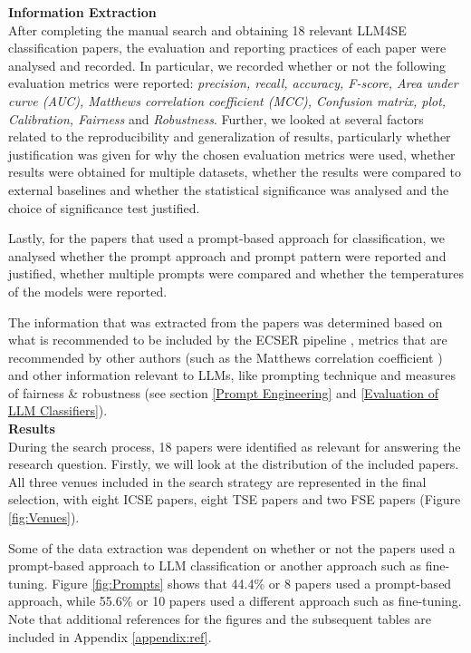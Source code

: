 \documentclass[a4paper]{article}
\begin{document}
\textbf{Information Extraction}\\
After completing the manual search and obtaining 18 relevant LLM4SE classification papers, the evaluation and reporting practices of each paper were analysed and recorded. In particular, we recorded whether or not the following evaluation metrics were reported: \textit{precision, recall, accuracy, F-score, Area under curve (AUC), Matthews correlation coefficient (MCC), Confusion matrix, plot, Calibration, Fairness} and \textit{Robustness}.
Further, we looked at several factors related to the reproducibility and generalization of results, particularly whether justification was given for why the chosen evaluation metrics were used, whether results were obtained for multiple datasets, whether the results were compared to external baselines and whether the statistical significance was analysed and the choice of significance test justified. 

Lastly, for the papers that used a prompt-based approach for classification, we analysed whether the prompt approach and prompt pattern were reported and justified, whether multiple prompts were compared and whether the temperatures of the models were reported.

The information that was extracted from the papers was determined based on what is recommended to be included by the ECSER pipeline \cite{Dellanna2022}, metrics that are recommended by other authors (such as the Matthews correlation coefficient \cite{Chicco2020,Foody2023,Yao2020}) and other information relevant to LLMs, like prompting technique and measures of fairness \& robustness (see section \ref{Prompt Engineering} and \ref{Evaluation of LLM Classifiers}). \\

\textbf{Results}\\
During the search process, 18 papers were identified as relevant for answering the research question. Firstly, we will look at the distribution of the included papers. All three venues included in the search strategy are represented in the final selection, with eight ICSE papers, eight TSE papers and two FSE papers (Figure \ref{fig:Venues}). 
	
Some of the data extraction was dependent on whether or not the papers used a prompt-based approach to LLM classification or another approach such as fine-tuning. Figure \ref{fig:Prompts} shows that 44.4\% or 8 papers used a prompt-based approach, while  55.6\% or 10 papers used a different approach such as fine-tuning. Note that additional references for the figures and the subsequent tables are included in Appendix \ref{appendix:ref}.
\end{document}
